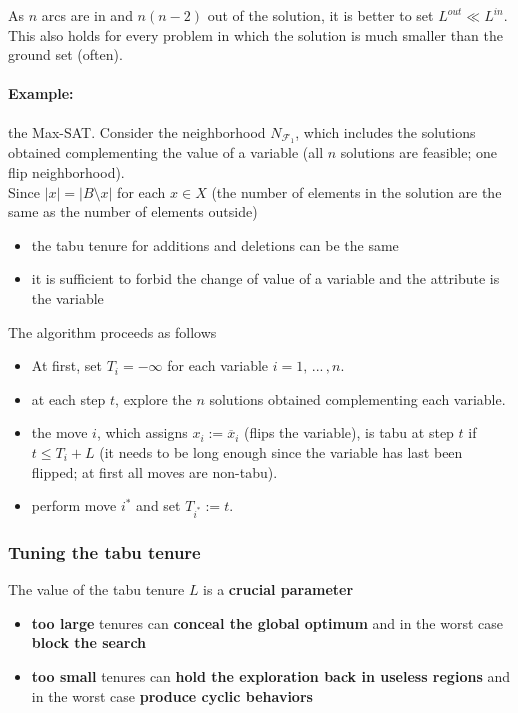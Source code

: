 \documentclass[11pt]{article}
\begin{document}
	As $n$ arcs are in and $n(n − 2)$ out of the solution, it is better to set $L^{out} \ll L^{in}$. This also holds for every problem in which the solution is much smaller than the ground set (often).\\
	
	\newpage
	
	\paragraph{Example:} the Max-SAT. Consider the neighborhood $N_{\mathcal{F}_1}$, which includes the solutions obtained complementing the value of a variable (all $n$ solutions are feasible; one flip neighborhood).\\
	
	Since $|x| = |B \setminus x|$ for each $x \in X$ (the number of elements in the solution are the same as the number of elements outside)
	\begin{itemize}
		\item the tabu tenure for additions and deletions can be the same
		
		\item it is sufficient to forbid the change of value of a variable and the attribute is the variable
	\end{itemize}
	
	The algorithm proceeds as follows
	\begin{itemize}
		\item At first, set $T_i = -\infty$ for each variable $i = 1,\, ... \, , n$.\\
		
		\item at each step $t$, explore the $n$ solutions obtained complementing each variable.\\
		
		\item the move $i$, which assigns $x_i := \overline{x}_i$ (flips the variable), is tabu at step $t$ if $t \leq T_i + L$ (it needs to be long enough since the variable has last been flipped; at first all moves are non-tabu).\\
		
		\item perform move $i^\ast$ and set $T_{i^\ast} := t$.\\
	\end{itemize}
	
	\newpage
	
	\subsubsection{Tuning the tabu tenure}
	The value of the tabu tenure $L$ is a \textbf{crucial parameter}
	\begin{itemize}
		\item \textbf{too large} tenures can \textbf{conceal the global optimum} and in the worst case \textbf{block the search}
		
		\item \textbf{too small} tenures can \textbf{hold the exploration back in useless regions} and in the worst case \textbf{produce cyclic behaviors}
	\end{itemize}
	\nn
	
\end{document}
